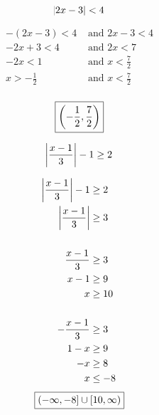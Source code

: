 \documentclass[letterpaper, landscape]{exam}
\begin{document}
\begin{questions}
    \question[10]
      \[ 
        \abs{ 2x - 3 } < 4 
      \]

      \begin{solution}
        \begin{align*}
          -(2x - 3) < 4    & \text{ and } 2x - 3 < 4 \\
          -2x + 3 < 4      & \text{ and } 2x < 7 \\
          -2x < 1          & \text{ and } x < \frac{7}{2} \\
          x > -\frac{1}{2} & \text{ and } x < \frac{7}{2} \\
        \end{align*}

        \[
          \boxed{ \intoo{ -\frac{1}{2}, \frac{7}{2} } }
        \]

      \end{solution}

    \ifprintanswers{}
      \newpage
    \fi

      \question[10]
        \[ 
          \abs{ \frac{x - 1}{3} } - 1 \geq 2 
        \]
        \begin{solution}
          \begin{align*}
            \abs{ \frac{x - 1}{3} } - 1 & \geq 2 \\
            \abs{ \frac{x - 1}{3} }     & \geq 3 \\
            \\
            \frac{x - 1}{3} & \geq 3 \\
            x - 1           & \geq 9 \\
            x               & \geq 10 \\
            \\
            - \frac{x - 1}{3} & \geq 3 \\
            1 - x             & \geq 9 \\
            - x               & \geq 8 \\
            x                 & \leq -8 \\
          \end{align*}
          \[
            \boxed{ \intoc{ -\infty, -8 } \cup \intco{ 10, \infty } }
          \]

        \end{solution}




\end{questions}
\end{document}
